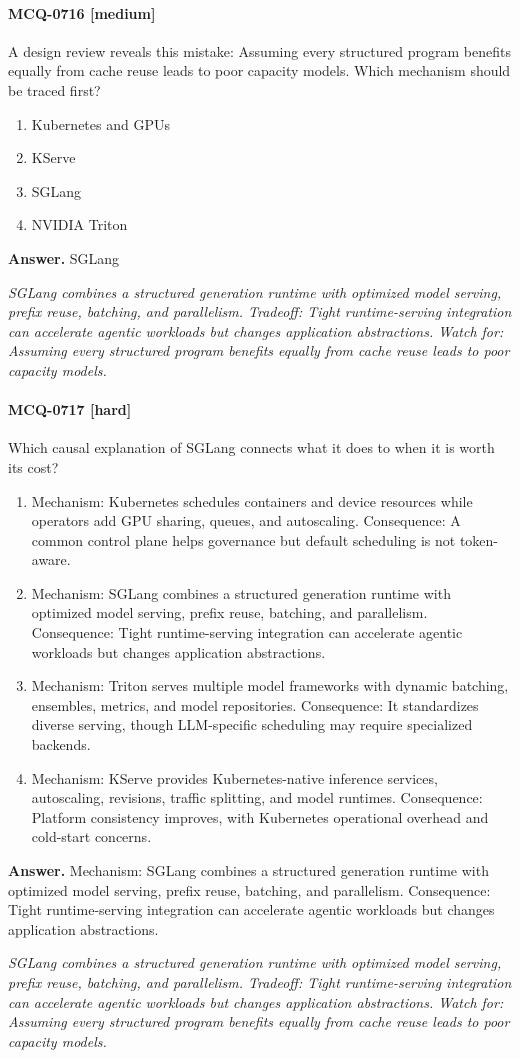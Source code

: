 \paragraph{MCQ-0716 [medium]} A design review reveals this mistake: Assuming every structured program benefits equally from cache reuse leads to poor capacity models. Which mechanism should be traced first?
\begin{enumerate}[label=\Alph*.]
\item Kubernetes and GPUs
\item KServe
\item SGLang
\item NVIDIA Triton
\end{enumerate}
\noindent\textbf{Answer.} SGLang
\par\textit{SGLang combines a structured generation runtime with optimized model serving, prefix reuse, batching, and parallelism. Tradeoff: Tight runtime-serving integration can accelerate agentic workloads but changes application abstractions. Watch for: Assuming every structured program benefits equally from cache reuse leads to poor capacity models.}
\paragraph{MCQ-0717 [hard]} Which causal explanation of SGLang connects what it does to when it is worth its cost?
\begin{enumerate}[label=\Alph*.]
\item Mechanism: Kubernetes schedules containers and device resources while operators add GPU sharing, queues, and autoscaling. Consequence: A common control plane helps governance but default scheduling is not token-aware.
\item Mechanism: SGLang combines a structured generation runtime with optimized model serving, prefix reuse, batching, and parallelism. Consequence: Tight runtime-serving integration can accelerate agentic workloads but changes application abstractions.
\item Mechanism: Triton serves multiple model frameworks with dynamic batching, ensembles, metrics, and model repositories. Consequence: It standardizes diverse serving, though LLM-specific scheduling may require specialized backends.
\item Mechanism: KServe provides Kubernetes-native inference services, autoscaling, revisions, traffic splitting, and model runtimes. Consequence: Platform consistency improves, with Kubernetes operational overhead and cold-start concerns.
\end{enumerate}
\noindent\textbf{Answer.} Mechanism: SGLang combines a structured generation runtime with optimized model serving, prefix reuse, batching, and parallelism. Consequence: Tight runtime-serving integration can accelerate agentic workloads but changes application abstractions.
\par\textit{SGLang combines a structured generation runtime with optimized model serving, prefix reuse, batching, and parallelism. Tradeoff: Tight runtime-serving integration can accelerate agentic workloads but changes application abstractions. Watch for: Assuming every structured program benefits equally from cache reuse leads to poor capacity models.}
